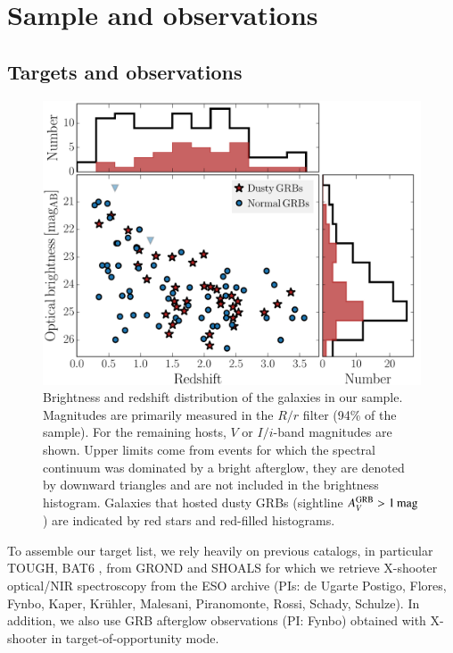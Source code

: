 \documentclass[traditabstract, longauth]{aa}
\begin{document}
\section{Sample and observations}


\subsection{Targets and observations}
\label{sec:tarob}

\begin{figure}
\includegraphics[angle=0, width=0.99\columnwidth]{Figs/Brightness.pdf}
\caption{Brightness and redshift distribution of the galaxies in our sample. Magnitudes are primarily measured in the $R/r$ filter (94\% of the sample). For the remaining hosts, $V$ or $I/i$-band magnitudes are shown. {Upper limits come from events for which the spectral continuum was dominated by a bright afterglow, they are denoted by downward triangles and are not included in the brightness histogram. Galaxies that hosted dusty GRBs (sightline $A^{\rm{GRB}}_V>1\,\rm{mag}$) are indicated by red stars and red-filled histograms.}}
\label{fig:brightness}
\end{figure}

 {To assemble our target list, we rely heavily on previous catalogs, in particular TOUGH, BAT6 \citep{2012ApJ...749...68S}, from GROND \citep{2011A&A...526A..30G, 2011A&A...534A.108K} and SHOALS} for which we retrieve X-shooter optical/NIR spectroscopy from the ESO archive (PIs: de Ugarte Postigo, Flores, Fynbo, Kaper, Kr\"uhler, Malesani, Piranomonte, Rossi, Schady, Schulze). In addition, we also use GRB afterglow observations (PI: Fynbo) obtained with X-shooter in target-of-opportunity mode. 
\end{document}
